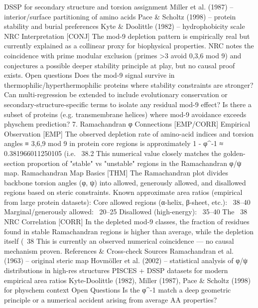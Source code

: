 DSSP for secondary structure and torsion assignment
Miller et al. (1987) – interior/surface partitioning of amino acids
Pace & Scholtz (1998) – protein stability and burial preferences
Kyte & Doolittle (1982) – hydrophobicity scale
NRC Interpretation [CONJ]
The mod-9 depletion pattern is empirically real but currently explained as a
collinear proxy
for biophysical properties.
NRC notes the coincidence with prime modular exclusion (primes >3 avoid 0,3,6 mod 9) and conjectures a possible deeper stability principle at play, but no causal proof exists.
Open questions
Does the mod-9 signal survive in thermophilic/hyperthermophilic proteins where stability constraints are stronger?
Can multi-regression be extended to include evolutionary conservation or secondary-structure-specific terms to isolate any residual mod-9 effect?
Is there a subset of proteins (e.g. transmembrane helices) where mod-9 avoidance exceeds physchem prediction?
7. Ramachandran φ Connections [EMP/CORR]
Empirical Observation [EMP]
The observed depletion rate of amino-acid indices and torsion angles ≡ 3,6,9 mod 9 in protein core regions is approximately 1 - φ^{-1} ≈ 0.381966011250105 (i.e. ~38.2%
This numerical value closely matches the golden-section proportion of "stable" vs "unstable" regions in the Ramachandran φ/ψ map.
Ramachandran Map Basics [THM]
The Ramachandran plot divides backbone torsion angles (φ, ψ) into allowed, generously allowed, and disallowed regions based on steric constraints.
Known approximate area ratios
(empirical from large protein datasets):
Core allowed regions (α-helix, β-sheet, etc.): ~38–40%
Marginal/generously allowed: ~20–25%
Disallowed (high-energy): ~35–40%
The ~38%
NRC Correlation [CORR]
In the depleted mod-9 classes, the fraction of residues found in stable Ramachandran regions is higher than average, while the depletion itself (~38%
This is currently an observed numerical coincidence — no causal mechanism proven.
References & Cross-check Sources
Ramachandran et al. (1963) – original steric map
Hovmöller et al. (2002) – statistical analysis of φ/ψ distributions in high-res structures
PISCES + DSSP datasets for modern empirical area ratios
Kyte-Doolittle (1982), Miller (1987), Pace & Scholtz (1998) for physchem context
Open Questions
Is the φ^{-1} match a deep geometric principle or a numerical accident arising from average AA properties?
